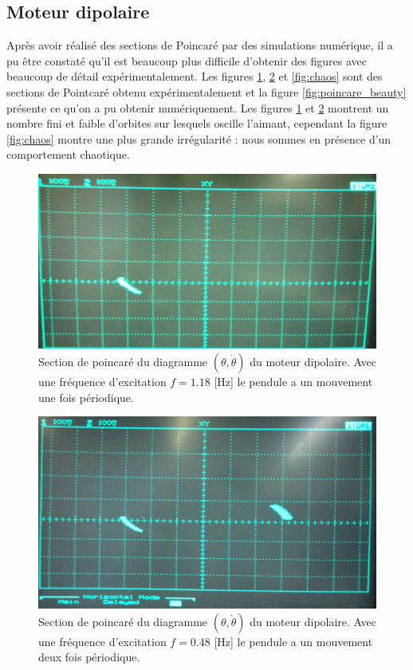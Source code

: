 \documentclass[a4paper,12pt,oneside]{article}
\begin{document}
\subsection{Moteur dipolaire}

Après avoir réalisé des sections de Poincaré par des simulations numérique, il a pu être constaté qu'il est beaucoup plus difficile d'obtenir des figures avec beaucoup de détail expérimentalement. Les figures \ref{fig:dipol1T}, \ref{fig:dipol2T} et \ref{fig:chaos} sont des sections de Pointcaré obtenu expérimentalement et la figure \ref{fig:poincare_beauty} présente ce qu'on a pu obtenir numériquement. Les figures \ref{fig:dipol1T} et \ref{fig:dipol2T} montrent un nombre fini et faible d'orbites sur lesquels oscille l'aimant, cependant la figure \ref{fig:chaos} montre une plus grande irrégularité : nous sommes en présence d'un comportement chaotique.






\begin{figure}[h!]
  \begin{center}
  \includegraphics[width=.5\linewidth,angle=0]{./figures/1T_1_18Hz.jpg}
  \caption{Section de poincaré du diagramme $(\theta,\dot{\theta})$ du moteur dipolaire. Avec une fréquence d'excitation $f=1.18$ [Hz] le pendule a un mouvement une fois périodique.} \label{fig:dipol1T}
  \end{center}
\end{figure}

\begin{figure}[h!]
  \begin{center}
  \includegraphics[width=0.5\linewidth,angle=0]{./figures/2T_0_48Hz.jpg}
  \caption{Section de poincaré du diagramme $(\theta,\dot{\theta})$ du moteur dipolaire. Avec une fréquence d'excitation $f=0.48$ [Hz] le pendule a un mouvement deux fois périodique.} \label{fig:dipol2T}
  \end{center}
\end{figure}
\end{document}
